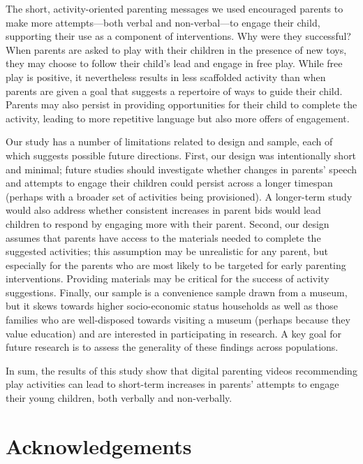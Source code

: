 \documentclass[
  english,
  man]{apa6}
\begin{document}
The short, activity-oriented parenting messages we used encouraged parents to make more attempts---both verbal and non-verbal---to engage their child, supporting their use as a component of interventions.
Why were they successful?
When parents are asked to play with their children in the presence of new toys, they may choose to follow their child's lead and engage in free play.
While free play is positive, it nevertheless results in less scaffolded activity than when parents are given a goal that suggests a repertoire of ways to guide their child.
Parents may also persist in providing opportunities for their child to complete the activity, leading to more repetitive language but also more offers of engagement.

Our study has a number of limitations related to design and sample, each of which suggests possible future directions.
First, our design was intentionally short and minimal; future studies should investigate whether changes in parents' speech and attempts to engage their children could persist across a longer timespan (perhaps with a broader set of activities being provisioned).
A longer-term study would also address whether consistent increases in parent bids would lead children to respond by engaging more with their parent.
Second, our design assumes that parents have access to the materials needed to complete the suggested activities; this assumption may be unrealistic for any parent, but especially for the parents who are most likely to be targeted for early parenting interventions.
Providing materials may be critical for the success of activity suggestions.
Finally, our sample is a convenience sample drawn from a museum, but it skews towards higher socio-economic status households as well as those families who are well-disposed towards visiting a museum (perhaps because they value education) and are interested in participating in research.
A key goal for future research is to assess the generality of these findings across populations.

In sum, the results of this study show that digital parenting videos recommending play activities can lead to short-term increases in parents' attempts to engage their young children, both verbally and non-verbally.

\hypertarget{acknowledgements}{%
\section{Acknowledgements}\label{acknowledgements}}
\end{document}
